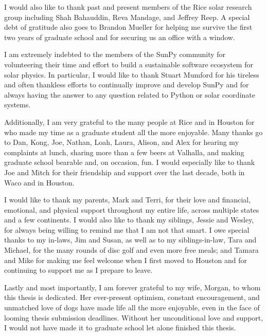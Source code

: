 \begin{acknowledgements}
I would also like to thank past and present members of the Rice solar research group including Shah Bahauddin, Reva Mandage, and Jeffrey Reep. A special debt of gratitude also goes to Brandon Mueller for helping me survive the first two years of graduate school and for securing us an office with a window.

I am extremely indebted to the members of the SunPy community for volunteering their time and effort to build a sustainable software ecosystem for solar physics. In particular, I would like to thank Stuart Mumford for his tireless and often thankless efforts to continually improve and develop SunPy and for always having the answer to any question related to Python or solar coordinate systems.

Additionally, I am very grateful to the many people at Rice and in Houston for who made my time as a graduate student all the more enjoyable. Many thanks go to Dan, Kong, Joe, Nathan, Loah, Laura, Alison, and Alex for hearing my complaints at lunch, sharing more than a few beers at Valhalla, and making graduate school bearable and, on occasion, fun. I would especially like to thank Joe and Mitch for their friendship and support over the last decade, both in Waco and in Houston.

I would like to thank my parents, Mark and Terri, for their love and financial, emotional, and physical support throughout my entire life, across multiple states and a few continents. I would also like to thank my siblings, Jessie and Wesley, for always being willing to remind me that I am not that smart. I owe special thanks to my in-laws, Jim and Susan, as well as to my siblings-in-law, Tara and Michael, for the many rounds of disc golf and even more free meals; and Tamara and Mike for making me feel welcome when I first moved to Houston and for continuing to support me as I prepare to leave.

Lastly and most importantly, I am forever grateful to my wife, Morgan, to whom this thesis is dedicated. Her ever-present optimism, constant encouragement, and unmatched love of dogs have made life all the more enjoyable, even in the face of looming thesis submission deadlines. Without her unconditional love and support, I would not have made it to graduate school let alone finished this thesis.

\end{acknowledgements}
